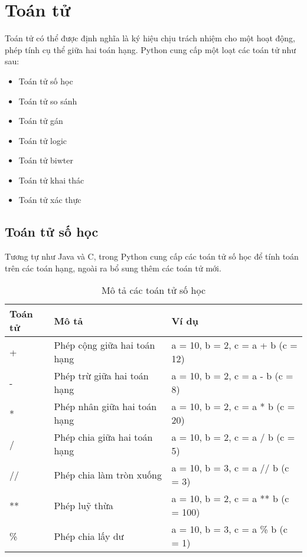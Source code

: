 \section{Toán tử}
Toán tử có thể được định nghĩa là ký hiệu chịu trách nhiệm cho một hoạt động, phép tính cụ thể giữa hai toán hạng. Python cung cấp một loạt các toán tử như sau:
\begin{itemize}
	\itemsep\setlength{0em}
	\item Toán tử số học
	\item Toán tử so sánh
	\item Toán tử gán
	\item Toán tử logic
	\item Toán tử biwter
	\item Toán tử khai thác
	\item Toán tử xác thực
\end{itemize}
\subsection{Toán tử số học}
Tương tự như Java và C, trong Python cung cấp các toán tử số học để tính toán trên các toán hạng, ngoài ra bổ sung thêm các toán tử mới.
\begin{table}[h]
	\centering
	\begin{tabular}{|l||l||l|}
		\hline
		Toán tử & Mô tả & Ví dụ \\
		\hline
		+ & Phép cộng giữa hai toán hạng & a = 10, b = 2, c = a + b (c = 12) \\
		\hline
		- & Phép trừ giữa hai toán hạng & a = 10, b = 2, c = a - b (c = 8) \\
		\hline
		* & Phép nhân giữa hai toán hạng & a = 10, b = 2, c = a * b (c = 20) \\
		\hline
		/ & Phép chia giữa hai toán hạng & a = 10, b = 2, c = a / b (c = 5)  \\
		\hline
		// & Phép chia làm tròn xuống & a = 10, b = 3, c = a // b (c = 3) \\
		\hline
		** & Phép luỹ thừa & a = 10, b = 2, c = a ** b (c = 100) \\
		\hline
		\% & Phép chia lấy dư & a = 10, b = 3, c = a \% b (c = 1) \\
		\hline
	\end{tabular}
	\caption{Mô tả các toán tử số học}
\end{table}

